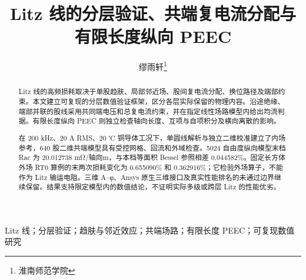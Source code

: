 \documentclass[journal,10pt]{IEEEtran}
\title{Litz 线的分层验证、共端复电流分配与有限长度纵向 PEEC}
\author{缪雨轩\thanks{淮南师范学院}}
\date{}
\begin{document}
\maketitle
\begin{abstract}
Litz 线的高频损耗取决于单股趋肤、局部邻近场、股间复电流分配、换位路径及端部约束。本文建立可复现的分层数值验证框架，区分各层实际保留的物理内容。沿途绝缘、端部并联的股线采用共同端电压和总复电流约束，并在指定线性场路模型内给出均流判据。有限长度纵向 PEEC 则独立检查轴向长度、互项与自项积分及横向离散的影响。

在 200 kHz、20 A RMS、20 ℃ 铜导体工况下，单圆线解析与独立二维校准建立了内场参考，640 股二维共端模型具有受控网格、回流和外域检查。5024 自由度纵向模型末档 Rac 为 20.012738 mΩ/轴向m，与本档等面积 Bessel 参照相差 0.044582\%。固定长方体外场 RT0 算例的末两次损耗变化为 0.655090\% 和 0.362916\%；它检验外场算子，不能作为 Litz 输运电阻。三维 A–φ、Ansys 原生三维接口及真实性能排名的未通过边界继续保留。结果支持限定模型内的数值结论，不证明实际多级或跨层 Litz 的性能优劣。
\end{abstract}
\begin{IEEEkeywords}
Litz 线；分层验证；趋肤与邻近效应；共端场路；有限长度 PEEC；可复现数值研究
\end{IEEEkeywords}









\renewcommand{\refname}{参考文献}

\end{document}
